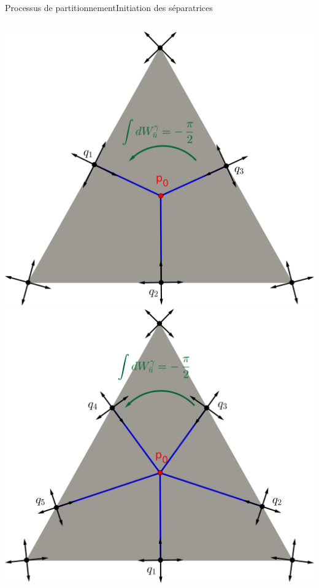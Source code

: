 \documentclass[compress,10pt,aspectratio=169]{beamer}
\begin{document}
\begin{frame}{Processus de partitionnement}{Initiation des séparatrices}


\small
\begin{columns}
\begin{column}{0.7\textwidth}
\centering
\includegraphics[scale=0.38]{images/triangle separatrices 3.png}
\includegraphics[scale=0.38]{images/triangle separatrices 5.png}
\end{column}


\end{columns}
\end{frame}
\end{document}
